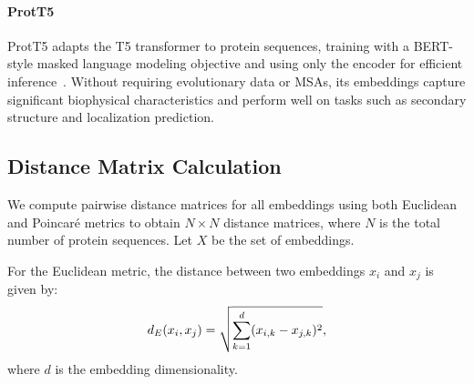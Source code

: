 \documentclass[]{Liebert_Author_revised}
\begin{document}
\paragraph{ProtT5~\citeauthor{elnaggar2007prottrans}}
ProtT5 adapts the T5 transformer to protein sequences, training with a BERT-style masked language modeling objective and using only the encoder for efficient inference~\citeauthor{elnaggar2007prottrans}. Without requiring evolutionary data or MSAs, its embeddings capture significant biophysical characteristics and perform well on tasks such as secondary structure and localization prediction.





\subsection{Distance Matrix Calculation}

We compute pairwise distance matrices for all embeddings using both Euclidean and Poincaré metrics to obtain $N \times N$ distance matrices, where $N$ is the total number of protein sequences. Let $X$ be the set of embeddings.  

For the Euclidean metric, the distance between two embeddings $x_i$ and $x_j$ is given by:
\begin{equation}
\scriptsize
d_E(x_i, x_j) = \sqrt{\sum_{k=1}^d (x_{i,k} - x_{j,k})^2},
\end{equation}
where $d$ is the embedding dimensionality.  
\end{document}

